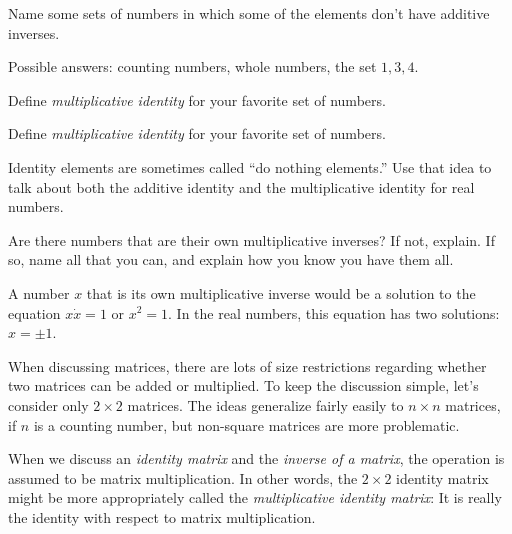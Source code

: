 \documentclass{ximera}
\begin{document}
\begin{question}Name some sets of numbers in which some of the elements don't have additive inverses.  
\begin{freeResponse}
Possible answers:  counting numbers, whole numbers, the set ${1, 3, 4}$.  
\end{freeResponse}
\end{question}

\begin{question}Define \emph{multiplicative identity} for your favorite set of numbers.  
\begin{freeResponse}
\end{freeResponse}
\end{question}

\begin{question}Define \emph{multiplicative identity} for your favorite set of numbers.  
\begin{freeResponse}
\end{freeResponse}
\end{question}

\begin{question}Identity elements are sometimes called ``do nothing elements.''  Use that idea to talk about both the additive identity and the multiplicative identity for real numbers.  
\begin{freeResponse}
\end{freeResponse}
\end{question}

\begin{question}
Are there numbers that are their own multiplicative inverses?  If not, explain.  If so, name all that you can, and explain how you know you have them all.
\begin{freeResponse}
A number $x$ that is its own multiplicative inverse would be a solution to the equation $x\dot x=1$ or $x^2=1$.  In the real numbers, this equation has two solutions:  $x = \pm 1$.  
\end{freeResponse}
\end{question}

When discussing matrices, there are lots of size restrictions regarding whether two matrices can be added or multiplied.  To keep the discussion simple, let's consider only $2\times 2$ matrices.  The ideas generalize fairly easily to $n\times n$  matrices, if $n$ is a counting number, but non-square matrices are more problematic.  

When we discuss an \emph{identity matrix} and the \emph{inverse of a matrix}, the operation is assumed to be matrix multiplication.  In other words, the $2\times 2$ identity matrix might be more appropriately called the \emph{multiplicative identity matrix}:  It is really the identity with respect to matrix multiplication.  
\end{document}
